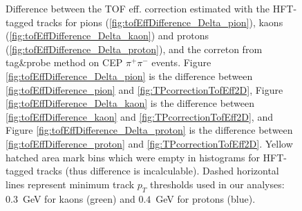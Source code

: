 \begin{figure}[h]
{\begin{subfigure}[b]{\linewidth}{
                }
  \end{subfigure}
} 
\quad
\parbox{0.31\textwidth}{
  \centering
  \begin{subfigure}[b]{\linewidth}{
                }
  \end{subfigure}
}
\caption[Difference between the TOF eff. correction estimated with the HFT-tagged tracks and with tag\&probe method.]%
    {Difference between the TOF eff. correction estimated with the HFT-tagged tracks for pions (\ref{fig:tofEffDifference_Delta_pion}), kaons (\ref{fig:tofEffDifference_Delta_kaon}) and protons (\ref{fig:tofEffDifference_Delta_proton}), and the correton from tag\&probe method on CEP $\pi^{+}\pi^{-}$ events. Figure \ref{fig:tofEffDifference_Delta_pion} is the difference between \ref{fig:tofEffDifference_pion} and \ref{fig:TPcorrectionTofEff2D}, Figure \ref{fig:tofEffDifference_Delta_kaon} is the difference between \ref{fig:tofEffDifference_kaon} and \ref{fig:TPcorrectionTofEff2D}, and Figure \ref{fig:tofEffDifference_Delta_proton} is the difference between \ref{fig:tofEffDifference_proton} and \ref{fig:TPcorrectionTofEff2D}. Yellow hatched area mark bins which were empty in histograms for HFT-tagged tracks (thus difference is incalculable). Dashed horizontal lines represent minimum track $p_{T}$ thresholds used in our analyses: $0.3$~GeV for kaons (green) and $0.4$~GeV for protons (blue).}\label{fig:tofEffDifference_Delta}%
\end{figure}


